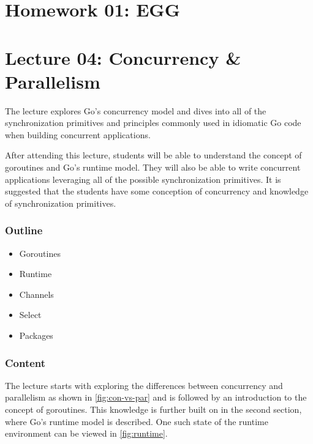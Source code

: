 \documentclass[
  digital,
  color,
  oneside,
  nosansbold,
  nocolorbold,
  nolof,
  nolot,
]{fithesis4}
\begin{document}
\section{Homework 01: EGG}

\section{Lecture 04: Concurrency \& Parallelism}

The lecture explores Go's concurrency model and dives into all of the synchronization primitives and principles commonly used in idiomatic Go code when building concurrent applications.

After attending this lecture, students will be able to understand the concept of goroutines and Go's runtime model. They will also be able to write concurrent applications leveraging all of the possible synchronization primitives. It is suggested that the students have some conception of concurrency and knowledge of synchronization primitives.

\subsubsection{Outline}

\begin{itemize}
    \item Goroutines
    \item Runtime
    \item Channels
    \item Select
    \item Packages
\end{itemize}

\subsubsection{Content}

The lecture starts with exploring the differences between concurrency and parallelism as shown in \cref{fig:con-vs-par} and is followed by an introduction to the concept of goroutines. This knowledge is further built on in the second section, where Go's runtime model is described. One such state of the runtime environment can be viewed in \cref{fig:runtime}.
\end{document}
